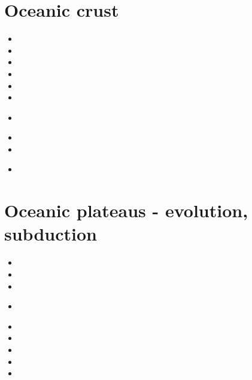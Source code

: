 \section{Oceanic crust} 

\begin{scriptsize}
\begin{itemize}
\item[\nineteeneightyeight] 
\item[\nineteenninetyfour] 
\item[\nineteenninetysix] 
\item[\twothousandfour] 
\item[\twothousandseven] 
\item[\twothousandeight] 
\item[\twothousandthirteen] 
 \\
\item[\twothousandfifteen] 
\item[\twothousandseventeen] 
\item[\twothousandtwenty] 
 \\ 
\end{itemize}
\end{scriptsize}




\section{Oceanic plateaus - evolution, subduction}

\begin{scriptsize}
\begin{itemize}
\item[\twothousandtwo]
\item[\twothousandtwelve]
\item[\twothousandthirteen]
\item[\twothousandfourteen]
\\
\item[\twothousandfifteen]
\item[\twothousandtwenty]
\item[\twothousandtwentyone]
\item[\twothousandtwentytwo]
\item[\twothousandtwentythree]
\end{itemize}
\end{scriptsize}



